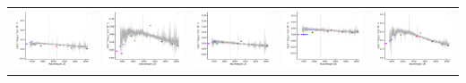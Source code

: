 \begin{center}
\begin{longtable}{l l l l l }
    \includegraphics[width=0.19\linewidth, clip]{Figs/Figs-sdss/spec-1143-52592-0242-SPLUS-s02s08-040033.pdf} & \includegraphics[width=0.19\linewidth, clip]{Figs/Figs-sdss/spec-1144-53238-0450-STRIPE82-0138-042700.pdf} & \includegraphics[width=0.19\linewidth, clip]{Figs/Figs-sdss/spec-1152-52941-0144-STRIPE82-0123-036291.pdf} & \includegraphics[width=0.19\linewidth, clip]{Figs/Figs-sdss/spec-1152-52941-0599-STRIPE82-0123-045029.pdf} & \includegraphics[width=0.19\linewidth, clip]{Figs/Figs-sdss/spec-1474-52933-0180-STRIPE82-0129-037205.pdf} \\

\end{longtable}
\end{center}
